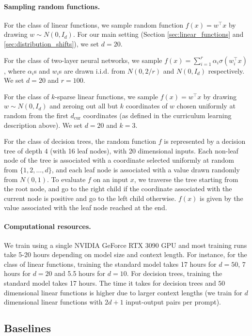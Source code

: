 \documentclass{article}
\begin{document}
\paragraph{Sampling random functions.} For the class of linear functions, we sample random function $f(x) = w^\top x$ by drawing $w \sim N(0, I_d)$. For our main setting (Section \ref{sec:linear_functions} and \ref{sec:distribution_shifts}), we set $d = 20$.

For the class of two-layer neural networks, we sample $f(x) = \sum_{i = 1}^r \alpha_i \sigma(w_i^\top x)$, where $\alpha_i$s and $w_i$s are drawn i.i.d. from $N(0, 2/r)$ and $N(0, I_d)$ respectively.  We set $d = 20$ and $r = 100$.

For the class of $k$-sparse linear functions, we sample $f(x) = w^\top x$ by drawing $w \sim N(0, I_d)$ and zeroing out all but $k$ coordinates of $w$ chosen uniformly at random from the first $d_\text{cur}$ coordinates (as defined in the curriculum learning description above).
We set $d = 20$ and $k = 3$. 

For the class of decision trees, the random function $f$ is represented by a decision tree of depth $4$ (with 16 leaf nodes), with 20 dimensional inputs. Each non-leaf node of the tree is associated with a coordinate selected uniformly at random from $\{1, 2, \ldots, d\}$, and each leaf node is associated with a value drawn randomly from $N(0, 1)$. To evaluate $f$ on an input $x$, we traverse the tree starting from the root node, and go to the right child if the coordinate associated with the current node is positive and go to the left child otherwise. $f(x)$ is given by the value associated with the leaf node reached at the end.

\paragraph{Computational resources.}
We train using a single NVIDIA GeForce RTX 3090 GPU and most training runs  take 5-20 hours depending on model size and context length. For instance, for the class of linear functions, training the standard model takes 17 hours for $d = 50$, 7 hours for $d = 20$ and 5.5 hours for $d = 10$. For decision trees, training the standard model takes 17 hours. The time it takes for decision trees and $50$ dimensional linear functions is higher due to larger context lengths (we train for $d$ dimensional linear functions with $2d+1$ input-output pairs per prompt).

\subsection{Baselines}
\label{app:baselines}
\end{document}
